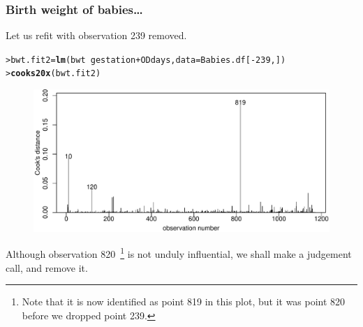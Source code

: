\documentclass{beamer}\usepackage[]{graphicx}\usepackage[]{xcolor}
\makeatletter
\newcommand{\hlnum}[1]{\textcolor[rgb]{0.686,0.059,0.569}{#1}}%
\newcommand{\hlopt}[1]{\textcolor[rgb]{0,0,0}{#1}}%
\newcommand{\hlstd}[1]{\textcolor[rgb]{0.345,0.345,0.345}{#1}}%
\newcommand{\hlkwb}[1]{\textcolor[rgb]{0.69,0.353,0.396}{#1}}%
\newcommand{\hlkwc}[1]{\textcolor[rgb]{0.333,0.667,0.333}{#1}}%
\newcommand{\hlkwd}[1]{\textcolor[rgb]{0.737,0.353,0.396}{\textbf{#1}}}%
\newenvironment{kframe}{%
 \def\at@end@of@kframe{}%
 \ifinner\ifhmode%
  \def\at@end@of@kframe{\end{minipage}}%
  \begin{minipage}{\columnwidth}%
 \fi\fi%
 \def\FrameCommand##1{\hskip\@totalleftmargin \hskip-\fboxsep
 \colorbox{shadecolor}{##1}\hskip-\fboxsep
     \hskip-\linewidth \hskip-\@totalleftmargin \hskip\columnwidth}%
 \MakeFramed {\advance\hsize-\width
   \@totalleftmargin\z@ \linewidth\hsize
   \@setminipage}}%
 {\par\unskip\endMakeFramed%
 \at@end@of@kframe}
\newenvironment{knitrout}{}{} %
\makeatother
\begin{document}
\begin{frame}[fragile]
\frametitle{Birth weight of babies\ldots}
Let us refit with observation 239 removed.
\begin{knitrout}\scriptsize
{}\color{fgcolor}\begin{kframe}
\begin{alltt}
\hlstd{> }\hlstd{bwt.fit2}\hlkwb{=}\hlkwd{lm}\hlstd{(bwt}\hlopt{~} \hlstd{gestation}\hlopt{+}\hlstd{ODdays,}\hlkwc{data} \hlstd{= Babies.df[}\hlopt{-}\hlnum{239}\hlstd{,])}
\hlstd{> }\hlkwd{cooks20x}\hlstd{(bwt.fit2)}
\end{alltt}
\end{kframe}
\end{knitrout}



\begin{figure}
  \centering
  \includegraphics[scale = 0.5]{figure/RC-H10-026}
\end{figure}

Although observation 820~\footnote{Note that it is now identified as point 819 in this plot, but it was point 820 before we dropped point 239.} is not unduly influential,
we shall make a judgement call, and remove it.
\end{frame}
\end{document}
